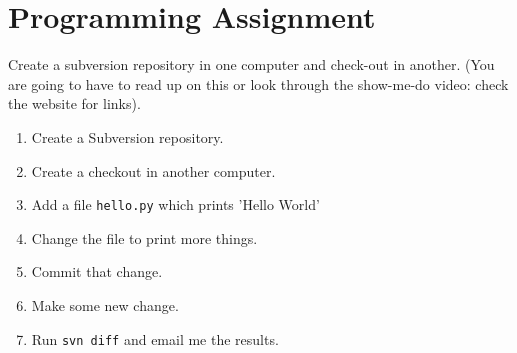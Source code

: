 \chapter{Programming Assignment}
Create a subversion repository in one computer and check-out in another. (You are going to have to read up on this or look through the show-me-do video: check the website for links).

\begin{enumerate}
\item Create a Subversion repository.
\item Create a checkout in another computer.
\item Add a file \texttt{hello.py} which prints 'Hello World'
\item Change the file to print more things.
\item Commit that change.
\item Make some new change.
\item Run \texttt{svn diff} and email me the results.
\end{enumerate}


